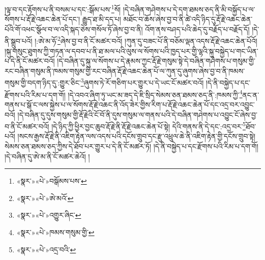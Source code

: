 །ལྟ་བ་དང་རྟོགས་པ་ནི་བསམ་པ་དང་:སྒོམ་པས་\footnote{«སྣར་»«པེ་»བསྒོམས་པས་}སོ། །དེ་བཞིན་གཤེགས་པ་དེ་དག་ཐམས་ཅད་ནི་མི་བསྐྱོད་པ་ལ་སོགས་པ་རྡོ་རྗེ་འཆང་ཆེན་པོ་དང་། རྒྱུད་ཐ་མི་དད་པ། མཐོང་བ་ཆོས་ཞེས་བྱ་བ་ནི་ཚེ་འདི་ཉིད་དུ་རྡོ་རྗེ་འཆང་ཆེན་པོའི་གོ་འཕང་སྩོལ་བ་ལ་འདི་སྐད་ཅེས་གསོལ་ཏོ་ཞེས་བྱ་བ་ནི། འོག་ནས་བཤད་པའི་ཆེད་དུ་བརྗོད་པ་བརྗོད་དོ། །དེ་ནི་སྒྲུབ་པའོ། །:ཨེ་མ་ཧོ་\footnote{«སྣར་»«པེ་»ཨེ་མའོ་}ཞེས་བྱ་བ་ནི་ངོ་མཚར་བའོ། །ཀུན་དུ་བཟང་པོ་ནི་བཅོམ་ལྡན་འདས་རྡོ་རྗེ་འཆང་ཆེན་པོའོ། །སྐུ་གསུང་ཐུགས་ཀྱི་གཏན་ལ་དབབ་པ་ནི་ཐ་མལ་པའི་ལུས་ལ་སོགས་པའི་ཁྱད་པར་གྱི་ལྷའི་སྐུ་བསྐྱེད་པ་གང་ཡིན་པ་དེ་ནི་ངོ་མཚར་བའོ། །དེ་བཞིན་དུ་སྐུ་ལ་སོགས་པ་དེ་རྣམས་ཀྱང་རྡོ་རྗེ་གསུམ་སྟེ་དེ་བཞིན་གཤེགས་པ་གསུམ་གྱི་རང་བཞིན་གསུམ་ནི་ཁམས་གསུམ་གྱི་རང་བཞིན་རྡོ་རྗེ་འཆང་ཆེན་པོ་ལ་ཀུན་དུ་ཞུགས་ཞེས་བྱ་བ་ནི་ཁམས་གསུམ་གྱི་བདག་ཉིད་དུ་:གྱུར་ཅིང་\footnote{«སྣར་»«པེ་»འགྱུར་ཞིང་}ཞུགས་ཏེ་རོ་གཅིག་པར་གྱུར་པ་དེ་ཡང་ངོ་མཚར་བའོ། །དེ་ནི་བསྐྱེད་པ་དང་རྫོགས་པའི་རིམ་པ་དག་གོ། །དེ་འབའ་ཞིག་ཏུ་ཡང་མ་ཟད་དེ་ཇི་སྲིད་སེམས་ཅན་ཐམས་ཅད་ནི་:ཁམས་ཀྱི་\footnote{«སྣར་»«པེ་»ཁམས་གསུམ་གྱི་}ནང་ན་གནས་པ་སྒོ་ང་ལས་སྐྱེས་པ་ལ་སོགས་རྡོ་རྗེ་འཆང་ནི་འོད་ཟེར་གྱིས་རིག་པ་རྡོ་རྗེ་འཆང་ཆེན་པོ་དང་འདྲ་བར་འབྱུང་བའོ། །དེ་བཞིན་དུ་དུས་གསུམ་གྱི་རྡོ་རྗེའི་ངོ་བོ་ནི་དུས་གསུམ་ལ་གནས་པའི་དེ་བཞིན་གཤེགས་པ་འབྱུང་ངོ་ཞེས་བྱ་བ་ནི་ངོ་མཚར་བའོ། །དེ་ཉིད་ཀྱི་ཕྱིར་བྱང་ཆུབ་རྡོ་རྗེ་ནི་རྡོ་རྗེ་འཆང་ཆེན་པོ་སྟེ། དེའི་གནས་ནི་དེ་དང་:འདྲ་བར་\footnote{«སྣར་»«པེ་»འདྲ་བའི་}ཐོབ་པའོ། །སངས་རྒྱས་རྡོ་རྗེ་ནི་འཇིག་རྟེན་ལས་འདས་པའི་དངོས་གྲུབ་དང་རྫུ་འཕྲུལ་ཆེ་ནི་འཇིག་རྟེན་གྱི་དངོས་གྲུབ་སྟེ། སེམས་ཅན་ཐམས་ཅད་ཀྱིས་དེ་ཐོབ་པར་གྱུར་པ་དེ་ནི་ངོ་མཚར་ཏོ། །དེ་ནི་བསྐྱེད་པ་དང་རྫོགས་པའི་རིམ་པ་དག་གོ། །དེ་བཞིན་དུ་ཨེ་མ་ནི་ངོ་མཚར་ཆེའོ། །
